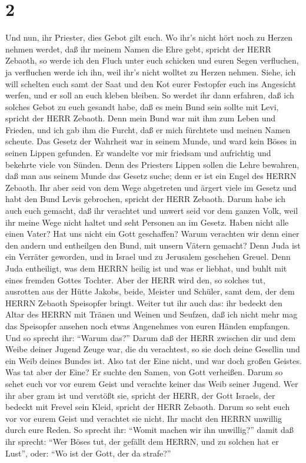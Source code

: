 \hypertarget{section-1}{%
\section{2}\label{section-1}}

 Und nun, ihr Priester, dies Gebot gilt euch. 
Wo ihr's nicht hört noch zu Herzen nehmen werdet, daß ihr meinem Namen
die Ehre gebt, spricht der HERR Zebaoth, so werde ich den Fluch unter
euch schicken und euren Segen verfluchen, ja verfluchen werde ich ihn,
weil ihr's nicht wolltet zu Herzen nehmen.  Siehe, ich will
schelten euch samt der Saat und den Kot eurer Festopfer euch ins
Angesicht werfen, und er soll an euch kleben bleiben.  So
werdet ihr dann erfahren, daß ich solches Gebot zu euch gesandt habe,
daß es mein Bund sein sollte mit Levi, spricht der HERR Zebaoth.
 Denn mein Bund war mit ihm zum Leben und Frieden, und ich
gab ihm die Furcht, daß er mich fürchtete und meinen Namen scheute.
 Das Gesetz der Wahrheit war in seinem Munde, und ward kein
Böses in seinen Lippen gefunden. Er wandelte vor mir friedsam und
aufrichtig und bekehrte viele von Sünden.  Denn des
Priesters Lippen sollen die Lehre bewahren, daß man aus seinem Munde das
Gesetz suche; denn er ist ein Engel des HERRN Zebaoth.  Ihr
aber seid von dem Wege abgetreten und ärgert viele im Gesetz und habt
den Bund Levis gebrochen, spricht der HERR Zebaoth.  Darum
habe ich auch euch gemacht, daß ihr verachtet und unwert seid vor dem
ganzen Volk, weil ihr meine Wege nicht haltet und seht Personen an im
Gesetz.  Haben nicht alle einen Vater? Hat uns nicht ein
Gott geschaffen? Warum verachten wir denn einer den andern und
entheilgen den Bund, mit unsern Vätern gemacht?  Denn Juda
ist ein Verräter geworden, und in Israel und zu Jerusalem geschehen
Greuel. Denn Juda entheiligt, was dem HERRN heilig ist und was er
liebhat, und buhlt mit eines fremden Gottes Tochter.  Aber
der HERR wird den, so solches tut, ausrotten aus der Hütte Jakobs,
beide, Meister und Schüler, samt dem, der dem HERRN Zebaoth Speisopfer
bringt.  Weiter tut ihr auch das: ihr bedeckt den Altar des
HERRN mit Tränen und Weinen und Seufzen, daß ich nicht mehr mag das
Speisopfer ansehen noch etwas Angenehmes von euren Händen empfangen.
 Und so sprecht ihr: ``Warum das?'' Darum daß der HERR
zwischen dir und dem Weibe deiner Jugend Zeuge war, die du verachtest,
so sie doch deine Gesellin und ein Weib deines Bundes ist. 
Also tat der Eine nicht, und war doch großen Geistes. Was tat aber der
Eine? Er suchte den Samen, von Gott verheißen. Darum so sehet euch vor
vor eurem Geist und verachte keiner das Weib seiner Jugend.
 Wer ihr aber gram ist und verstößt sie, spricht der HERR,
der Gott Israels, der bedeckt mit Frevel sein Kleid, spricht der HERR
Zebaoth. Darum so seht euch vor vor eurem Geist und verachtet sie nicht.
 Ihr macht den HERRN unwillig durch eure Reden. So sprecht
ihr: ``Womit machen wir ihn unwillig?'' damit daß ihr sprecht: ``Wer
Böses tut, der gefällt dem HERRN, und zu solchen hat er Lust'', oder:
``Wo ist der Gott, der da strafe?''

